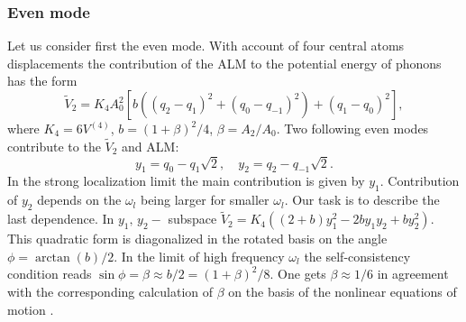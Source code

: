 \subsubsection{Even mode}
Let us consider first the even mode. With account of four central atoms 
displacements the contribution of the ALM to the potential energy of phonons 
has the form 
$$
\tilde{V}_2 = K_4 A_0^2 [b((q_2-q_1)^2+(q_0 -q_{-1})^2)+(q_1 - q_0)^2], 
$$
where $K_4= 6V^{(4)}$, $b=(1+\beta)^2/4$, $\beta = A_2/A_0$.  
Two following even modes contribute to the $\tilde{V}_2 $ and ALM: 
$$
y_1 = {q_0-q_1}{\sqrt{2}},\quad y_2 = {q_2-q_{-1}}{\sqrt{2}}.
$$
In the strong localization limit the main contribution is given by $y_1$. 
Contribution of $y_2$ depends on the $\omega_l$ being larger for smaller 
$\omega_l$. Our task is to describe the last dependence. In $y_1,\,y_2-$ 
subspace  $\tilde{V}_2 = K_4((2+b)y_1^2 - 2b y_1y_2 + b y_2^2)$. 
This quadratic form is diagonalized in the rotated basis on the angle
$\phi =\arctan{(b)}/2$.
In the limit of high frequency $\omega_l$ the self-consistency condition  
reads 
$\sin{\phi}=\beta \approx b/2 = (1+\beta)^2/8.$
One gets 
$\beta \approx 1/6$ in agreement with the corresponding calculation of $\beta$
on the basis of the nonlinear equations of motion \cite{page}. 

